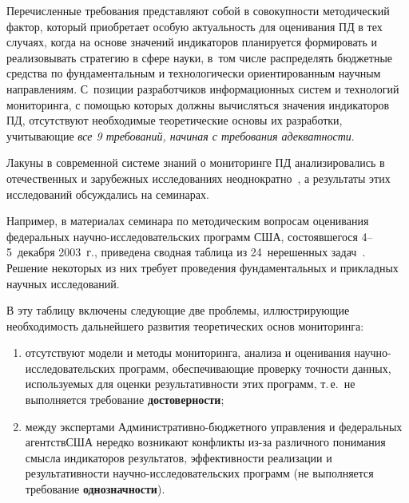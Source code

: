 \begin{multicols}{2}
      Перечисленные требования представляют собой в совокупности методический фактор, 
который приобретает особую актуальность для оценивания ПД в тех случаях, когда на основе 
значений индикаторов планируется формировать и реализовывать стратегию в сфере науки, 
в~том числе распределять бюджетные средства по фундаментальным и технологически 
ориентированным научным направлениям. С~позиции разработчиков информационных систем 
и технологий мониторинга, с помощью которых должны вычисляться значения индикаторов 
ПД, отсутствуют необходимые теоретические основы их разработки, учитывающие \textit{все 9 
требований, начиная с требования адекватности}.
      
      Лакуны в современной системе знаний о мониторинге ПД анализировались в 
отечественных и зарубежных исследованиях неоднократно~\cite{22-zat, 23-zat, 26-zat, 25-zat}, а 
результаты этих исследований обсуждались на семинарах.
      
      Например, в материалах семинара по методическим вопросам оценивания федеральных 
на\-уч\-но-ис\-сле\-до\-ва\-тель\-ских программ США, состоявшегося 4--5~декабря 2003~г., 
приведена сводная таблица из 24~нерешенных задач~\cite{26-zat}. Решение некоторых из них 
требует проведения фундаментальных и прикладных научных исследований.
      
      В эту таблицу включены следующие две проблемы, иллюстрирующие необходимость 
дальнейшего развития теоретических основ мониторинга:
      \begin{enumerate}[(1)]
\item отсутствуют модели и методы мониторинга, анализа и оценивания 
на\-уч\-но-ис\-сле\-до\-ва\-тель\-ских программ, обеспечивающие проверку точности данных, 
используемых для оценки результативности этих программ, т.\,е.\ не выполняется 
требование \textbf{достоверности};
\item между экспертами Адми\-ни\-стра\-тив\-но-бюд\-жет\-но\-го управ\-ле\-ния и 
федеральных агентств\linebreak США нередко возникают конфликты из-за различного понимания 
смысла индикаторов результатов, эффективности реализации и результативности 
научно-исследовательских программ (не выполняется требование 
\textbf{однозначности}).
\end{enumerate}


\end{multicols}
